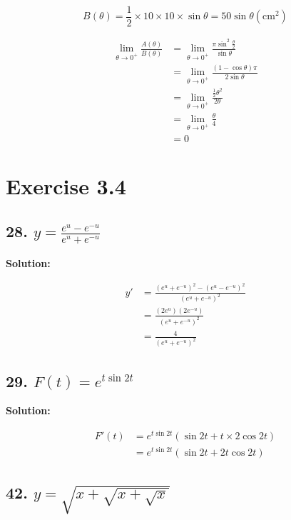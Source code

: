 \documentclass{article}
\newenvironment{solution}{
    \par \textbf{Solution: } \quad \par
}{\par}
\begin{document}
    $$B(\theta) = \frac 1 2 \times 10 \times 10 \times \sin \theta = 50 \sin \theta(\textrm{cm}^2)$$

    $$\begin{aligned}
        \lim_{\theta \to 0^+}\frac{A(\theta)}{B(\theta)} &= \lim_{\theta \to 0^+}\frac{\pi \sin^2 \frac{\theta}{2}}{\sin \theta} \\
        &= \lim_{\theta \to 0^+}\frac{(1 - \cos \theta) \pi}{2\sin \theta} \\
        &= \lim_{\theta \to 0^+}\frac{\frac 1 2 \theta^2}{2 \theta} \\
        &= \lim_{\theta \to 0^+}\frac{\theta}{4} \\
        &= 0
    \end{aligned}$$

    \section*{Exercise 3.4}
    \subsection*{28. $y = \frac{e^u - e^{-u}}{e^u + e^{-u}}$}

    \begin{solution}
        $$\begin{aligned}
            y' &= \frac{(e^u + e^{-u})^2 - (e^u - e^{-u})^2}{(e^u + e^{-u})^2} \\
            &= \frac{(2e^u)(2e^{-u})}{(e^u + e^{-u})^2} \\
            &= \frac{4}{(e^u + e^{-u})^2}
        \end{aligned}$$
    \end{solution}

    \subsection{29. $F(t) = e^{t \sin 2t}$}

    \begin{solution}
        $$\begin{aligned}
            F'(t) &= e^{t \sin 2t}(\sin 2t + t \times 2\cos 2t) \\
            &= e^{t \sin 2t}(\sin 2t + 2t \cos 2t)
        \end{aligned}$$
    \end{solution}

    \subsection*{42. $y = \sqrt{x + \sqrt{x + \sqrt x}}$}
\end{document}
